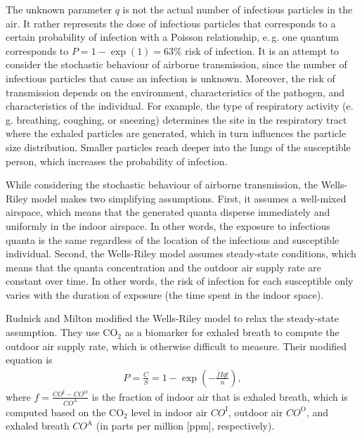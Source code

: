 \documentclass[fleqn,11pt]{wlscirep_supp}
\newcommand\eg{e.\,g.\xspace}
\begin{document}
The unknown parameter $q$ is not the actual number of infectious particles in the air. It rather represents the dose of infectious particles that corresponds to a certain probability of infection with a Poisson relationship, \eg one quantum corresponds to $P = 1 - \exp (1) = 63\%$ risk of infection\cite{Rudnick2003IndoorAir}. It is an attempt to consider the stochastic behaviour of airborne transmission, since the number of infectious particles that cause an infection is unknown. Moreover, the risk of transmission depends on the environment, characteristics of the pathogen, and characteristics of the individual. For example, the type of respiratory activity (\eg breathing, coughing, or sneezing) determines the site in the respiratory tract where the exhaled particles are generated, which in turn influences the particle size distribution\cite{Wei2016AMJIC}. Smaller particles reach deeper into the lungs of the susceptible person\cite{Wang2021Science}, which increases the probability of infection. 

While considering the stochastic behaviour of airborne transmission, the Wells-Riley model makes two simplifying assumptions. First, it assumes a well-mixed airspace, which means that the generated quanta disperse immediately and uniformly in the indoor airspace. In other words, the exposure to infectious quanta is the same regardless of the location of the infectious and susceptible individual. Second, the Wells-Riley model assumes steady-state conditions, which means that the quanta concentration and the outdoor air supply rate are constant over time. In other words, the risk of infection for each susceptible only varies with the duration of exposure (the time spent in the indoor space). 

Rudnick and Milton\cite{Rudnick2003IndoorAir} modified the Wells-Riley model to relax the steady-state assumption. They use CO$_2$ as a biomarker for exhaled breath to compute the outdoor air supply rate, which is otherwise difficult to measure. Their modified equation is
\begin{align}
    P = \frac{C}{S} = 1 - \exp \left(-\frac{\bar{f}Iqt}{n}\right),
\end{align}
where $f = \frac{CO^{\text{I}}-CO^{\text{O}}}{CO^{\text{A}}}$ is the fraction of indoor air that is exhaled breath, which is computed based on the CO$_2$ level in indoor air $CO^{\text{I}}$, outdoor air $CO^{\text{O}}$, and exhaled breath $CO^{\text{A}}$ (in parts per million [ppm], respectively). 
\end{document}
